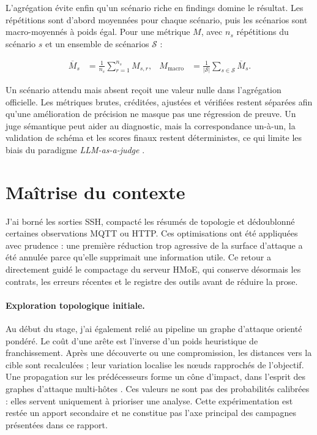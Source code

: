 L'agrégation évite enfin qu'un scénario riche en findings domine le résultat.
Les répétitions sont d'abord moyennées pour chaque scénario, puis les scénarios
sont macro-moyennés à poids égal. Pour une métrique \(M\), avec \(n_s\)
répétitions du scénario \(s\) et un ensemble de scénarios \(\mathcal{S}\) :

\begin{align}
  \overline{M}_s &= \frac{1}{n_s}\sum_{r=1}^{n_s} M_{s,r},
  & M_{\mathrm{macro}} &= \frac{1}{|\mathcal{S}|}
  \sum_{s\in\mathcal{S}} \overline{M}_s.
\end{align}

Un scénario attendu mais absent reçoit une valeur nulle dans l'agrégation
officielle. Les métriques brutes, créditées, ajustées et vérifiées restent
séparées afin qu'une amélioration de précision ne
masque pas une régression de preuve. Un juge sémantique peut aider au diagnostic,
mais la correspondance un-à-un, la validation de schéma et les scores finaux
restent déterministes, ce qui limite les biais du paradigme
\emph{LLM-as-a-judge} \cite{zheng2023judge}.

\section{Maîtrise du contexte}

J'ai borné les sorties SSH, compacté les résumés de topologie et dédoublonné
certaines observations MQTT ou HTTP. Ces optimisations ont été appliquées avec
prudence : une première réduction trop agressive de la surface d'attaque a été
annulée parce qu'elle supprimait une information utile. Ce retour a directement
guidé le compactage du serveur HMoE, qui conserve désormais les contrats, les
erreurs récentes et le registre des outils avant de réduire la prose.

\paragraph{Exploration topologique initiale.}
Au début du stage, j'ai également relié au pipeline un graphe d'attaque orienté
pondéré. Le coût d'une arête est l'inverse d'un poids heuristique de
franchissement. Après une découverte ou une compromission, les distances vers la
cible sont recalculées ; leur variation localise les nœuds rapprochés de
l'objectif. Une propagation sur les prédécesseurs forme un cône d'impact, dans
l'esprit des graphes d'attaque multi-hôtes \cite{ou2005mulval}. Ces valeurs ne
sont pas des probabilités calibrées : elles servent uniquement à prioriser une
analyse. Cette expérimentation est restée un apport secondaire et ne constitue
pas l'axe principal des campagnes présentées dans ce rapport.

